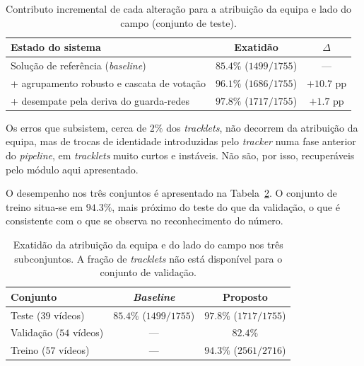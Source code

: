\begin{table}[htbp]
    \centering
    \caption{Contributo incremental de cada alteração para a atribuição da equipa e lado do campo (conjunto de teste).}
    \label{tab:team-resultados}
    \begin{tabular}{lcc}
        \hline
        \textbf{Estado do sistema} & \textbf{Exatidão} & \textbf{$\Delta$} \\
        \hline
        Solução de referência (\emph{baseline})        & $85.4\%$ ($1499/1755$) & --- \\
        \; + agrupamento robusto e cascata de votação   & $96.1\%$ ($1686/1755$) & $+10.7$ pp \\
        \; + desempate pela deriva do guarda-redes      & $97.8\%$ ($1717/1755$) & $+1.7$ pp \\
        \hline
    \end{tabular}
\end{table}

Os erros que subsistem, cerca de $2\%$ dos \emph{tracklets}, não decorrem da atribuição da equipa, mas de trocas de identidade introduzidas pelo \emph{tracker} numa fase anterior do \emph{pipeline}, em \emph{tracklets} muito curtos e instáveis. Não são, por isso, recuperáveis pelo módulo aqui apresentado.

O desempenho nos três conjuntos é apresentado na Tabela~\ref{tab:team-conjuntos}. O conjunto de treino situa-se em $94.3\%$, mais próximo do teste do que da validação, o que é consistente com o que se observa no reconhecimento do número.

\begin{table}[htbp]
    \centering
    \caption{Exatidão da atribuição da equipa e do lado do campo nos três subconjuntos. A fração de
    \emph{tracklets} não está disponível para o conjunto de validação.}
    \label{tab:team-conjuntos}
    \begin{tabular}{lcc}
        \hline
        \textbf{Conjunto} & \textbf{\emph{Baseline}} & \textbf{Proposto} \\
        \hline
        Teste ($39$ vídeos)     & $85.4\%$ ($1499/1755$) & $97.8\%$ ($1717/1755$) \\
        Validação ($54$ vídeos) & ---                    & $82.4\%$ \\
        Treino ($57$ vídeos)    & ---                    & $94.3\%$ ($2561/2716$) \\
        \hline
    \end{tabular}
\end{table}


